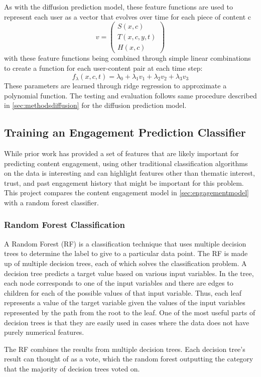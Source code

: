 As with the diffusion prediction model, these feature functions are used to represent each user as a vector that evolves over time for each piece of content c
$$v = \begin{pmatrix} S(x, c) \\ T(x, c, y, t) \\ H(x, c) \end{pmatrix} $$
with these feature functions being combined through simple linear combinations to create a function for each user-content pair at each time step:
$$f_\lambda(x, c, t) = \lambda_0 + \lambda_1v_1 + \lambda_2v_2 + \lambda_3v_3$$
These parameters are learned through ridge regression to approximate a polynomial function.  The testing and evaluation follows same procedure described in \ref{sec:methodsdiffusion} for the diffusion prediction model.
\subsection{Training an Engagement Prediction Classifier}
While prior work has provided a set of features that are likely important for predicting content engagement, using other traditional classification algorithms on the data is interesting and can highlight features other than thematic interest, trust, and past engagement history that might be important for this problem.  This project compares the content engagement model in \ref{sec:engagementmodel} with a random forest classifier.
\subsubsection{Random Forest Classification}
A Random Forest (RF) is a classification technique that uses multiple decision trees to determine the label to give to a particular data point.  The RF is made up of multiple decision trees, each of which solves the classification problem.  A decision tree predicts a target value based on various input variables.  In the tree, each node corresponds to one of the input variables and there are edges to children for each of the possible values of that input variable.  Thus, each leaf represents a value of the target variable given the values of the input variables represented by the path from the root to the leaf.  One of the most useful parts of decision trees is that they are easily used in cases where the data does not have purely numerical features.

The RF combines the results from multiple decision trees.  Each decision tree's result can thought of as a vote, which the random forest outputting the category that the majority of decision trees voted on.

